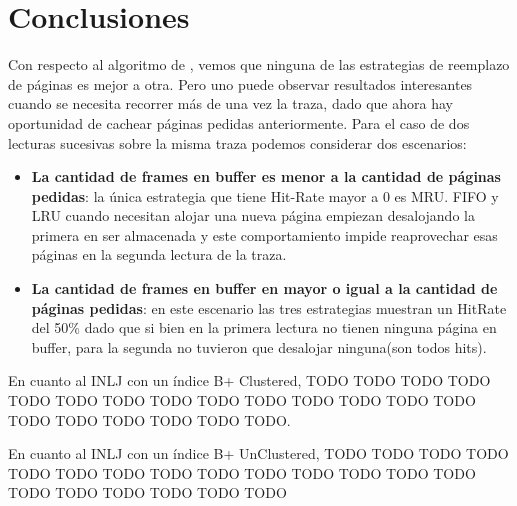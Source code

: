 \section{Conclusiones}

Con respecto al algoritmo de \fs, vemos que ninguna de las estrategias de reemplazo de páginas es mejor a otra.
\newline
Pero uno puede observar resultados interesantes cuando se necesita recorrer más de una vez la traza, dado que ahora hay oportunidad de cachear páginas pedidas anteriormente.
\newline
Para el caso de dos lecturas sucesivas sobre la misma traza podemos considerar dos escenarios:
\begin{itemize}
 \item    \textbf{La cantidad de frames en buffer es menor a la cantidad de páginas pedidas}: la única estrategia que tiene Hit-Rate mayor a 0 es MRU. FIFO y LRU cuando necesitan alojar una nueva página empiezan desalojando la primera en ser almacenada y este comportamiento impide reaprovechar esas páginas en la segunda lectura de la traza.
 \item    \textbf{La cantidad de frames en buffer en mayor o igual a la cantidad de páginas pedidas}: en este escenario las tres estrategias muestran un HitRate del 50\% dado que si bien en la primera lectura no tienen ninguna página en buffer, para la segunda no tuvieron que desalojar ninguna(son todos hits).
\end{itemize}

En cuanto al INLJ con un índice B+ Clustered,
TODO TODO TODO TODO TODO TODO TODO TODO TODO TODO TODO TODO TODO TODO TODO TODO TODO TODO TODO TODO.\newline

En cuanto al INLJ con un índice B+ UnClustered, 
  TODO TODO TODO TODO TODO TODO TODO TODO TODO TODO TODO TODO TODO TODO TODO TODO TODO TODO TODO TODO\newline

